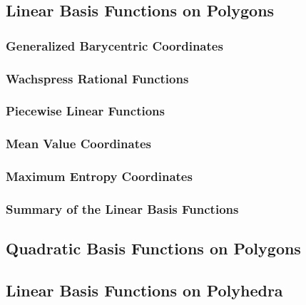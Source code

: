 \documentclass[compress,10pt]{beamer}
\begin{document}
\subsection{Linear Basis Functions on Polygons}
\begin{frame}[t]\frametitle{Generalized Barycentric Coordinates}

\end{frame}
\begin{frame}[t]\frametitle{Wachspress Rational Functions}

\end{frame}
\begin{frame}[t]\frametitle{Piecewise Linear Functions}

\end{frame}
\begin{frame}[t]\frametitle{Mean Value Coordinates}

\end{frame}
\begin{frame}[t]\frametitle{Maximum Entropy Coordinates}

\end{frame}
\begin{frame}[t]\frametitle{Summary of the Linear Basis Functions}

\end{frame}
\subsection{Quadratic Basis Functions on Polygons}

\subsection{Linear Basis Functions on Polyhedra}

\end{document}
